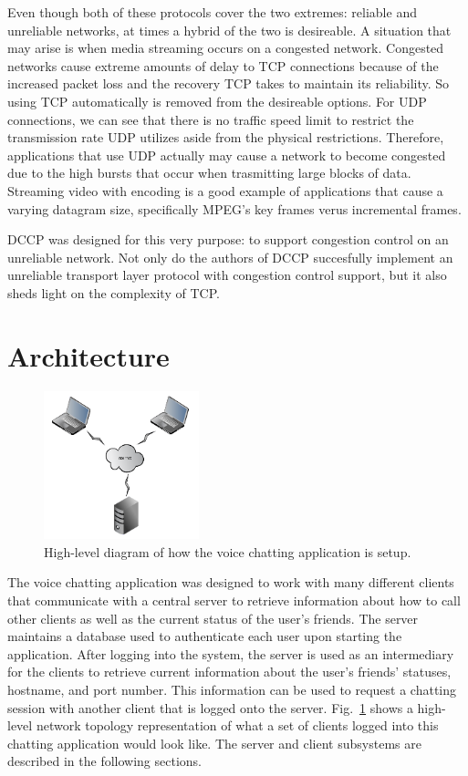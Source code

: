 \documentclass[letterpaper, 9 pt, balance, conference]{ieeeconf}
\begin{document}
Even though both of these protocols cover the two extremes: reliable and unreliable
networks, at times a hybrid of the two is desireable.  A situation
that may arise is when media streaming occurs on a congested network. 
Congested networks cause extreme amounts of delay to TCP connections because of
the increased packet loss and the recovery TCP takes to maintain its reliability. 
So using TCP automatically is removed from the desireable options.  For
UDP connections, we can see that there is no traffic speed limit to restrict the
transmission rate UDP utilizes aside from the physical restrictions.  Therefore, 
applications that use UDP actually
may cause a network to become congested due to the high bursts that occur when
trasmitting large blocks of data.  Streaming video with encoding is a good example 
of applications that cause a varying datagram size, specifically MPEG's key frames
verus incremental frames.

DCCP was designed for this very purpose: to support congestion control on an 
unreliable network.  Not only do the authors of DCCP succesfully implement an 
unreliable transport layer protocol with congestion control support, but it also 
sheds light on the complexity of TCP.

\section{Architecture}
\label{sec:architec}

\begin{figure}[h]
   \centering
      \includegraphics[width=0.4\textwidth]{pics/setup}
   \caption{High-level diagram of how the voice chatting application is setup.}
\label{fig:setup}
\end{figure}

The voice chatting application was designed to work with many different clients
that communicate with a central server to retrieve information about how to call
other clients as well as the current status of the user's friends. The server 
maintains a database used to authenticate each user upon starting the application.
After logging into the system, the server is used as an intermediary for the clients
to retrieve current information about the user's friends' statuses, hostname, and
port number. This information can be used to request a chatting session with another
client that is logged onto the server.  Fig.~\ref{fig:setup} shows a high-level
network topology representation of what a set of clients logged into this chatting 
application would look like.  The server and client subsystems are described in
the following sections.
\end{document}
